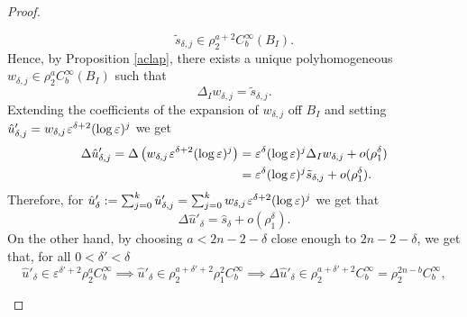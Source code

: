 \documentclass[a4paper,11pt]{article}
\begin{document}
\begin{proof}
\begin{itemize}
$$
\tilde s_{\delta,j} \in \rho_2^{a +2} C_b^\infty (B_{I}).
$$
Hence, by Proposition \ref{aclap}, there exists a unique polyhomogeneous $w_{\delta,j} \in \rho_2^a C_b^\infty(B_{I})$ such that 
$$
\Delta_{I} w_{\delta,j} = \tilde s_{\delta,j}. 
$$
Extending the coefficients of the expansion of $w_{\delta,j}$ off $B_{I}$ and setting $\hat u'_{\delta,j} = w_{\delta,j} \hspace{0.03cm} \varepsilon^{\delta +2} (\log \varepsilon)^j$ we get 
\begin{align*}
\Delta \hat u'_{\delta,j} = \Delta \left(w_{\delta,j} \hspace{0.03cm} \varepsilon^{\delta +2} (\log \varepsilon)^j \right) & = \varepsilon^\delta (\log \varepsilon)^j \Delta_I w_{\delta,j} + o(\rho_1^{\delta}) \\ & =  \varepsilon^\delta(\log \varepsilon)^j \tilde s_{\delta,j} + o(\rho_1^\delta). 
\end{align*}
Therefore, for $\hat u'_\delta := \sum_{j=0}^k \hat u'_{\delta, j} = \sum_{j=0}^k w_{\delta,j} \hspace{0.03cm} \varepsilon^{\delta +2} (\log \varepsilon)^j$ we get that
$$
\Delta \hat u'_\delta = \hat s_\delta + o(\rho_1^\delta).
$$
On the other hand, by choosing $a < 2n-2-\delta$ close enough to $2n-2-\delta$, we get that, for all $0<\delta'<\delta$ 
$$
\hat u'_\delta\in \varepsilon^{\delta' +2} \rho_2^a C_b^\infty \implies \hat u'_\delta \in \rho_2^{a+ \delta' +2} \rho_1^2 C_b^\infty \implies \Delta \hat u'_\delta \in \rho_2^{a+ \delta' +2} C_b^\infty = \rho_2^{2n - b} C_b^\infty, 
$$


\end{itemize}
\end{proof}
\end{document}
